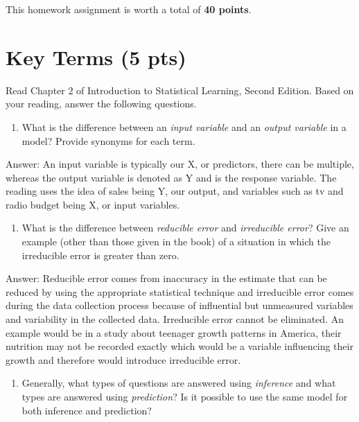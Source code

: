 \documentclass[
]{article}
\providecommand{\tightlist}{%
  \setlength{\itemsep}{0pt}\setlength{\parskip}{0pt}}
\begin{document}
This homework assignment is worth a total of \textbf{40 points}.

\hypertarget{key-terms-5-pts}{%
\section{Key Terms (5 pts)}\label{key-terms-5-pts}}

Read Chapter 2 of Introduction to Statistical Learning, Second Edition.
Based on your reading, answer the following questions.

\begin{enumerate}
\def\labelenumi{\arabic{enumi}.}
\tightlist
\item
  What is the difference between an \emph{input variable} and an
  \emph{output variable} in a model? Provide synonyms for each term.
\end{enumerate}

Answer: An input variable is typically our X, or predictors, there can
be multiple, whereas the output variable is denoted as Y and is the
response variable. The reading uses the idea of sales being Y, our
output, and variables such as tv and radio budget being X, or input
variables.

\begin{enumerate}
\def\labelenumi{\arabic{enumi}.}
\setcounter{enumi}{1}
\tightlist
\item
  What is the difference between \emph{reducible error} and
  \emph{irreducible error}? Give an example (other than those given in
  the book) of a situation in which the irreducible error is greater
  than zero.
\end{enumerate}

Answer: Reducible error comes from inaccuracy in the estimate that can
be reduced by using the appropriate statistical technique and
irreducible error comes during the data collection process because of
influential but unmeasured variables and variability in the collected
data. Irreducible error cannot be eliminated. An example would be in a
study about teenager growth patterns in America, their nutrition may not
be recorded exactly which would be a variable influencing their growth
and therefore would introduce irreducible error.

\begin{enumerate}
\def\labelenumi{\arabic{enumi}.}
\setcounter{enumi}{2}
\tightlist
\item
  Generally, what types of questions are answered using \emph{inference}
  and what types are answered using \emph{prediction}? Is it possible to
  use the same model for both inference and prediction?
\end{enumerate}
\end{document}
